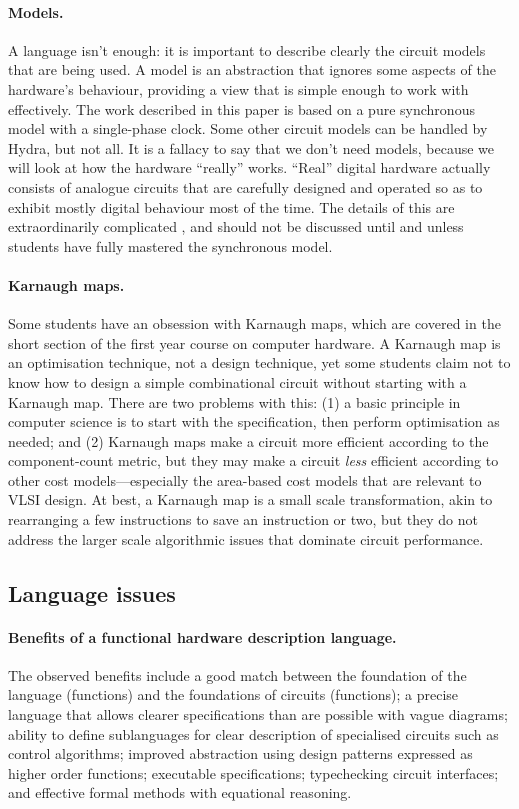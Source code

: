 \documentclass[submission,copyright,creativecommons]{eptcs}
\begin{document}
\paragraph{Models.}
A language isn't enough: it is important to describe clearly the
circuit models that are being used.  A model is an abstraction that
ignores some aspects of the hardware's behaviour, providing a view
that is simple enough to work with effectively.  The work described
in this paper is based on a pure synchronous model with a
single-phase clock.  Some other circuit models can be handled by
Hydra, but not all.  It is a fallacy to say that we don't need
models, because we will look at how the hardware ``really'' works.
``Real'' digital hardware actually consists of analogue circuits
that are carefully designed and operated so as to exhibit mostly
digital behaviour most of the time.  The details of this are
extraordinarily complicated \cite{W2000-DigDesign-Principles}, and
should not be discussed until and unless students have fully
mastered the synchronous model.

\paragraph{Karnaugh maps.}
Some students have an obsession with Karnaugh maps, which are
covered in the short section of the first year course on computer
hardware.  A Karnaugh map is an optimisation technique, not a
design technique, yet some students claim not to know how to design
a simple combinational circuit without starting with a Karnaugh
map.  There are two problems with this: (1) a basic principle in
computer science is to start with the specification, then perform
optimisation as needed; and (2) Karnaugh maps make a circuit more
efficient according to the component-count metric, but they may
make a circuit \emph{less} efficient according to other cost
models---especially the area-based cost models that are relevant to
VLSI design.  At best, a Karnaugh map is a small scale
transformation, akin to rearranging a few instructions to save an
instruction or two, but they do not address the larger scale
algorithmic issues that dominate circuit performance.

\subsection{Language issues}

\paragraph{Benefits of a functional hardware description language.}
The observed benefits include a good match between the foundation
of the language (functions) and the foundations of circuits
(functions); a precise language that allows clearer specifications
than are possible with vague diagrams; ability to define
sublanguages for clear description of specialised circuits such as
control algorithms; improved abstraction using design patterns
expressed as higher order functions; executable specifications;
typechecking circuit interfaces; and effective formal methods with
equational reasoning.
\end{document}

